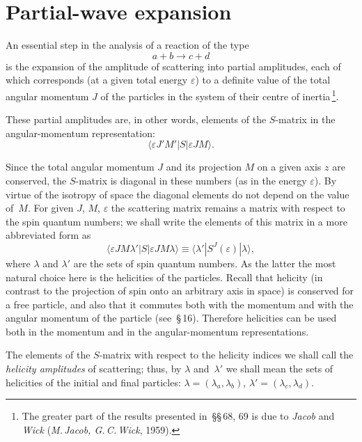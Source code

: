 \section{Partial-wave expansion}

An essential step in the analysis of a reaction of the type
\begin{equation}
a + b \to c + d
\tag{68.1}
\end{equation}
is the expansion of the amplitude of scattering into partial amplitudes, each of which corresponds (at a given total energy $\varepsilon$) to a definite value of the total angular momentum $J$ of the particles in the system of their centre of inertia\,\footnote{The greater part of the results presented in~\S\S\,68, 69 is due to \textit{Jacob} and \textit{Wick} (\textit{M.\,Jacob, G.\,C.\,Wick}, 1959).}.

These partial amplitudes are, in other words, elements of the $S$-matrix in the angular-momentum representation:
\begin{equation}
\langle\varepsilon J'M'|S|\varepsilon JM\rangle.
\end{equation}

Since the total angular momentum $J$ and its projection $M$ on a given axis $z$ are conserved, the $S$-matrix is diagonal in these numbers (as in the energy $\varepsilon$). By virtue of the isotropy of space the diagonal elements do not depend on the value of~$M$. For given $J$, $M$, $\varepsilon$ the scattering matrix remains a matrix with respect to the spin quantum numbers; we shall write the elements of this matrix in a more abbreviated form as
\begin{equation}
\langle\varepsilon JM\lambda'|S|\varepsilon JM\lambda\rangle \equiv \langle\lambda'|S^J(\varepsilon)|\lambda\rangle,
\tag{68.2}
\end{equation}
where $\lambda$ and $\lambda'$ are the sets of spin quantum numbers. As the latter the most natural choice here is the helicities of the particles. Recall that helicity (in contrast to the projection of spin onto an arbitrary axis in space) is conserved for a free particle, and also that it commutes both with the momentum and with the angular momentum of the particle (see~\S\,16). Therefore helicities can be used both in the momentum and in the angular-momentum representations.

The elements of the $S$-matrix with respect to the helicity indices we shall call the \textit{helicity amplitudes} of scattering; thus, by $\lambda$ and~$\lambda'$ we shall mean the sets of helicities of the initial and final particles: $\lambda = (\lambda_a, \lambda_b)$, $\lambda' = (\lambda_c, \lambda_d)$.

